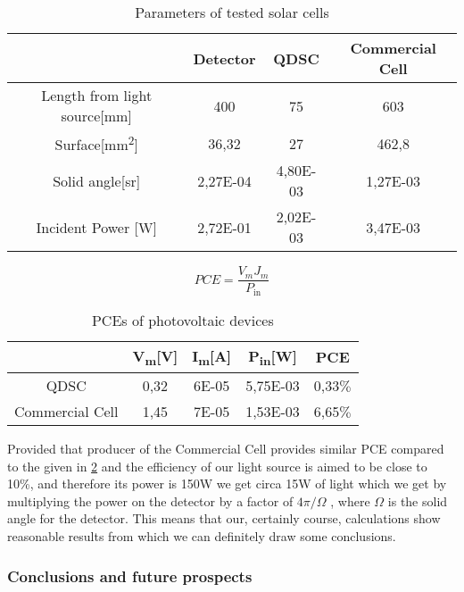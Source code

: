 \begin{table}[h]
\centering
\begin{tabular}{|c |c | c | c |}
\hline
& Detector & QDSC & Commercial Cell\\
\hline
Length from light source{[}mm{]} & 400 & 75 & 603\\
\hline
Surface{[}mm\textsuperscript{2}{]} & 36,32 & 27 & 462,8\\
\hline
Solid angle{[}sr{]} & 2,27E-04 & 4,80E-03 & 1,27E-03\\
\hline
Incident Power {[}W{]} & 2,72E-01 & 2,02E-03 & 3,47E-03\\
\hline
\end{tabular}
\caption{Parameters of tested solar cells}
\label{tab:1stparam}
\end{table}

\begin{equation}
PCE = \frac{V_{m}J_{m}}{P_{\text{in}}}
\end{equation}

\begin{table}[h]
\centering
\begin{tabular}{|c |c |c | c | c|}
\hline
& V\textsubscript{m}{[}V{]} & I\textsubscript{m}{[}A{]} &P\textsubscript{in}{[}W{]} & PCE\\
\hline
QDSC & 0,32 & 6E-05 & 5,75E-03 & 0,33$\%$\\
\hline
Commercial Cell & 1,45 & 7E-05 & 1,53E-03 & 6,65$\%$\\
\hline
\end{tabular}
\caption{PCEs of photovoltaic devices}
\label{tab:1stPCE}
\end{table}
\noindent Provided that producer of the Commercial Cell provides similar PCE
compared to the given in \ref{tab:1stPCE} and the efficiency of our light
source is aimed to be close to 10\%, and therefore its power is 150W we
get circa 15W of light which we get by multiplying the power on the
detector by a factor of $4\pi /\Omega $ , where $\Omega$ is the solid angle for the
detector. This means that our, certainly course, calculations show
reasonable results from which we can definitely draw some conclusions.

\subsubsection{Conclusions and future prospects}

